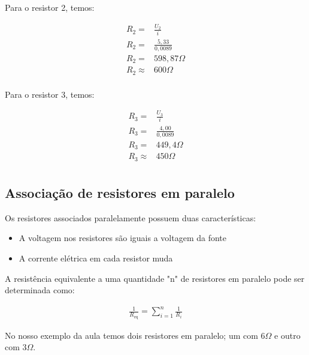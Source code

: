 Para o resistor 2, temos:

\begin{ceqn}
    \begin{align*}
        R_2 =& \frac{U_2}{i} \\
        R_2 =& \frac{5,33}{0,0089} \\
        R_2 =& 598,87\Omega \\
        R_2 \approx & 600 \Omega \\
    \end{align*}
\end{ceqn}

Para o resistor 3, temos:

\begin{ceqn}
    \begin{align*}
        R_3 =& \frac{U_3}{i} \\
        R_3 =& \frac{4,00}{0,0089} \\
        R_3 =& 449,4\Omega \\
        R_3 \approx & 450 \Omega \\
    \end{align*}
\end{ceqn}


\subsection{Associação de resistores em paralelo}

Os resistores associados paralelamente possuem duas características:

\begin{itemize}
    \item{A voltagem nos resistores são iguais a voltagem da fonte}
    \item{A corrente elétrica em cada resistor muda}
\end{itemize}

A resistência equivalente a uma quantidade "n" de resistores em paralelo pode ser determinada como:

\begin{ceqn}
    \begin{align*}
        \frac{1}{R_{\text{eq}}} = \sum_{i=1}^{n} \frac{1}{R_i}
    \end{align*}
\end{ceqn}


No nosso exemplo da aula temos dois resistores em paralelo; um com $6 \Omega$ e outro com $3 \Omega$.


